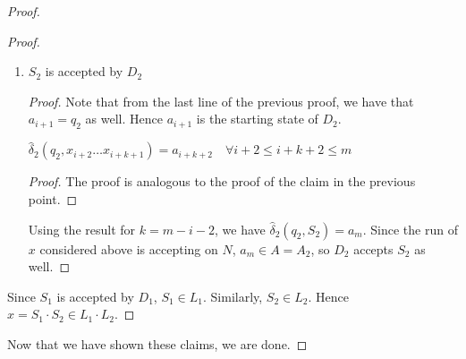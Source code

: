 \documentclass[a4paper]{article}
\begin{document}
\begin{proof}
\begin{proof}
\begin{enumerate}
\begin{proof}
                    Using the result for $j = i$, we can see that $\hat{\delta}_1(a_0, S_1) = a_i$. Now note that since $(a_i, x_{i+1}, a_{i+1}) \in \Delta$, with $a_i \in Q_1, a_{i+1} \in Q_2$,
                    we must have $(a_i, x_{i+1}, a_{i+1}) \in \Delta_2$, so $a_i \in A_1$, so $D_1$ accepts $S_1$.

                \end{proof}
            \item $S_2$ is accepted by $D_2$
                \begin{proof}
                    Note that from the last line of the previous proof, we have that $a_{i+1} = q_2$ as well. Hence $a_{i+1}$ is the starting state of $D_2$.
                    \begin{claim}
                        $\hat{\delta}_2(q_2, x_{i+2}\ldots x_{i+k+1}) = a_{i+k+2} \quad \forall i + 2 \le i + k + 2 \le m$
                    \end{claim}
                    \begin{proof}
                        The proof is analogous to the proof of the claim in the previous point.
                    \end{proof}
                    Using the result for $k = m - i - 2$, we have $\hat{\delta}_2(q_2, S_2) = a_m$. Since the run of $x$ considered above is accepting on $N$, $a_m \in A = A_2$, so $D_2$ accepts
                    $S_2$ as well.
                \end{proof}
        \end{enumerate}

        Since $S_1$ is accepted by $D_1$, $S_1 \in L_1$. Similarly, $S_2 \in L_2$. Hence $x = S_1 \cdot S_2 \in L_1 \cdot L_2$.

    \end{proof}


    Now that we have shown these claims, we are done.
\end{proof}
\end{document}
